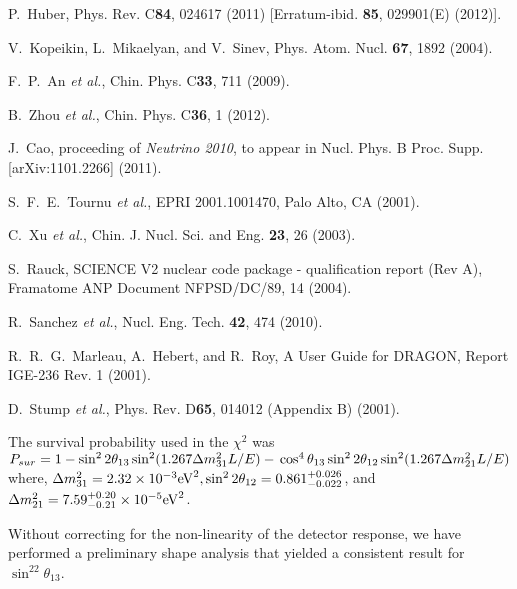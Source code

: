 \documentclass[aps,prl,showpacs,showkeys,amsmath,amssymb,
twocolumn,
floatfix,
superscriptaddress
]{revtex4-1}
\begin{document}
\begin{thebibliography}{99}
 P.~Huber, Phys. Rev. C{\bf 84}, 024617 (2011) [Erratum-ibid. {\bf 85}, 029901(E) (2012)].

 V.~Kopeikin, L.~Mikaelyan, and V.~Sinev, Phys. Atom. Nucl. {\bf 67}, 1892 (2004).

 F.~P.~An {\it et al.}, Chin. Phys. C{\bf 33}, 711 (2009).

 B.~Zhou {\it et al.}, Chin. Phys. C{\bf 36}, 1 (2012).

 J.~Cao, proceeding of {\it Neutrino 2010}, to appear in Nucl. Phys. B Proc. Supp. [arXiv:1101.2266] (2011).

 S.~F.~E.~Tournu {\it et al.}, EPRI 2001.1001470, Palo Alto, CA (2001).

 C.~Xu {\it et al.}, Chin. J. Nucl. Sci. and Eng. {\bf 23}, 26 (2003).

 S.~Rauck, SCIENCE V2 nuclear code package - qualification report (Rev A), Framatome ANP Document NFPSD/DC/89, 14 (2004).

 R.~Sanchez {\it et al.}, Nucl. Eng. Tech. {\bf 42}, 474 (2010).

 R.~R.~G.~Marleau, A.~Hebert, and R.~Roy, A User Guide for DRAGON, Report IGE-236 Rev. 1 (2001).

 D.~Stump {\it et al.}, Phys. Rev. D{\bf 65}, 014012 (Appendix B) (2001).

 The survival probability used in the $\chi^2$ was\\
$P_{sur} = 1 - \sin^22\theta_{13}\sin^2(1.267\Delta m^2_{31}L/E) - \\
\cos^4\theta_{13}\sin^22\theta_{12}\sin^2(1.267\Delta m^2_{21}L/E)$
where, $\\ \Delta m^2_{31} = 2.32\times10^{-3} {\rm eV}^2,
\sin^22\theta_{12} = 0.861^{+0.026}_{-0.022}$, and
$\\ \Delta m^2_{21} = 7.59^{+0.20}_{-0.21}\times 10^{-5} {\rm eV}^2$.

 Without correcting for the non-linearity of the detector response, we have performed a preliminary shape analysis that yielded a consistent result for $\sin^22\theta_{13}$.

\end{thebibliography}
\end{document}

